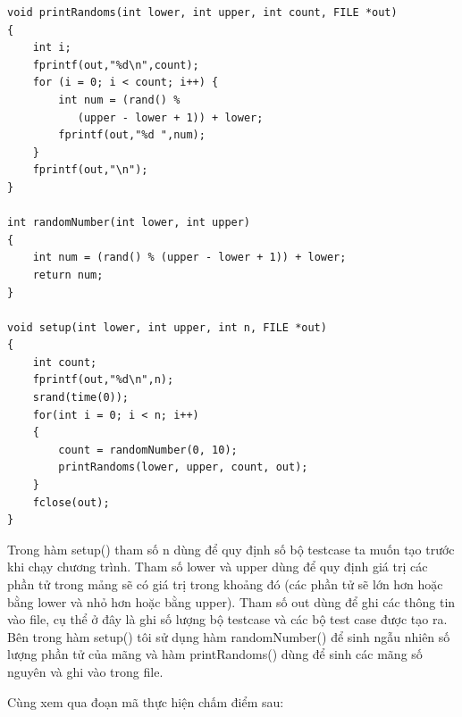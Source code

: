 \documentclass[12pt,a4paper]{article}
\begin{document}
\begin{lstlisting}
void printRandoms(int lower, int upper, int count, FILE *out) 
{ 
    int i;
    fprintf(out,"%d\n",count);
    for (i = 0; i < count; i++) { 
        int num = (rand() % 
           (upper - lower + 1)) + lower; 
        fprintf(out,"%d ",num); 
    }
    fprintf(out,"\n"); 
} 

int randomNumber(int lower, int upper)
{
    int num = (rand() % (upper - lower + 1)) + lower; 
    return num;
}

void setup(int lower, int upper, int n, FILE *out)
{
    int count;
    fprintf(out,"%d\n",n);
    srand(time(0)); 
    for(int i = 0; i < n; i++)
    {
        count = randomNumber(0, 10);
        printRandoms(lower, upper, count, out);
    } 
    fclose(out);
}
\end{lstlisting}

Trong hàm setup() tham số n dùng để quy định số bộ testcase ta muốn tạo trước khi chạy chương trình. Tham số lower và upper dùng để quy định giá trị các phần tử trong mảng sẽ có giá trị trong khoảng đó (các phần tử sẽ lớn hơn hoặc bằng lower và nhỏ hơn hoặc bằng upper). Tham số out dùng để ghi các thông tin vào file, cụ thể ở đây là ghi số lượng bộ testcase và các bộ test case được tạo ra. Bên trong hàm setup() tôi sử dụng hàm randomNumber() để sinh ngẫu nhiên số lượng phần tử của mãng và hàm printRandoms() dùng để sinh các mãng số nguyên và ghi vào trong file.

Cùng xem qua đoạn mã thực hiện chấm điểm sau:
\end{document}
